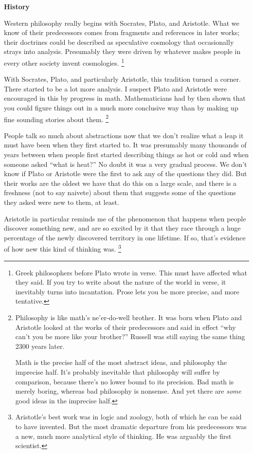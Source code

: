 \textbf{History}

Western philosophy really begins with Socrates, Plato, and Aristotle.
What we know of their predecessors comes from fragments and references
in later works; their doctrines could be described as speculative
cosmology that occasionally strays into analysis. Presumably they were
driven by whatever makes people in every other society invent
cosmologies. \footnote{Greek philosophers before Plato wrote in verse. This must have
affected what they said. If you try to write about the nature of the
world in verse, it inevitably turns into incantation. Prose lets you be
more precise, and more tentative.}

With Socrates, Plato, and particularly Aristotle, this tradition turned
a corner. There started to be a lot more analysis. I suspect Plato and
Aristotle were encouraged in this by progress in math. Mathematicians
had by then shown that you could figure things out in a much more
conclusive way than by making up fine sounding stories about them.
\footnote{Philosophy is like math's ne'er-do-well brother. It was born
when Plato and Aristotle looked at the works of their predecessors and
said in effect ``why can't you be more like your brother?'' Russell was
still saying the same thing 2300 years later.

Math is the precise half of the most abstract ideas, and philosophy the
imprecise half. It's probably inevitable that philosophy will suffer by
comparison, because there's no lower bound to its precision. Bad math is
merely boring, whereas bad philosophy is nonsense. And yet there are
\emph{some} good ideas in the imprecise half.}

People talk so much about abstractions now that we don't realize what a
leap it must have been when they first started to. It was presumably
many thousands of years between when people first started describing
things as hot or cold and when someone asked ``what is heat?'' No doubt
it was a very gradual process. We don't know if Plato or Aristotle were
the first to ask any of the questions they did. But their works are the
oldest we have that do this on a large scale, and there is a freshness
(not to say naivete) about them that suggests some of the questions they
asked were new to them, at least.

Aristotle in particular reminds me of the phenomenon that happens when
people discover something new, and are so excited by it that they race
through a huge percentage of the newly discovered territory in one
lifetime. If so, that's evidence of how new this kind of thinking was.
\footnote{Aristotle's best work was in logic and zoology, both of which he
can be said to have invented. But the most dramatic departure from his
predecessors was a new, much more analytical style of thinking. He was
arguably the first scientist.}

